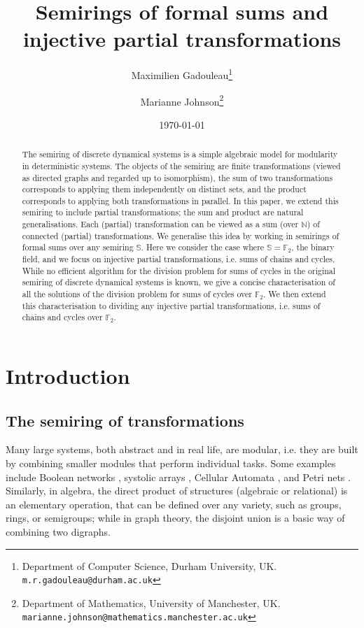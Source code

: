 \documentclass[a4paper, 11pt]{article}
\title{Semirings of formal sums and injective partial transformations}
\author{Maximilien Gadouleau\footnote{Department of Computer Science, Durham University, UK. \texttt{m.r.gadouleau@durham.ac.uk}} \and Marianne Johnson\footnote{Department of Mathematics,  University of Manchester, UK. \texttt{marianne.johnson@mathematics.manchester.ac.uk}}}
\date{\today}
\theoremstyle{plain}
\theoremstyle{definition}
\newcommand{\N} {\mathbb{N}}
\newcommand{\F} {\mathbb{F}}
\begin{document}
\maketitle

\begin{abstract}
The semiring of discrete dynamical systems is a simple algebraic model for modularity in deterministic systems. The objects of the semiring are finite transformations (viewed as directed graphs and regarded up to isomorphism), the sum of two transformations corresponds to applying them independently on distinct sets, and the product corresponds to applying both transformations in parallel. In this paper, we extend this semiring to include partial transformations; the sum and product are natural generalisations. Each (partial) transformation can be viewed as a sum (over $\N$) of connected (partial) transformations. We generalise this idea by working in semirings of formal sums over any semiring $\mathbb{S}$. Here we consider the case where $\mathbb{S} = \F_2$, the binary field, and we focus on injective partial transformations, i.e. sums of chains and cycles. While no efficient algorithm for the division problem for sums of cycles in the original semiring of discrete dynamical systems is known, we give a concise characterisation of all the solutions of the division problem for sums of cycles over $\F_2$. We then extend this characterisation to dividing any injective partial transformations, i.e. sums of chains and cycles over $\F_2$.
\end{abstract}

\section{Introduction} \label{section:introduction}

\subsection{The semiring of transformations} \label{subsection:semiring_of_transformations}

Many large systems, both abstract and in real life, are modular, i.e. they are built by combining smaller modules that perform individual tasks. Some examples include Boolean networks \cite{PPS21, KWVML23}, systolic arrays \cite{Pet92}, Cellular Automata \cite{Ped92, CCG01, McI09}, and Petri nets \cite{Dev16, Dev21, TCV22}. Similarly, in algebra, the direct product of structures (algebraic or relational) is an elementary operation, that can be defined over any variety, such as groups, rings, or semigroups; while in graph theory, the disjoint union is a basic way of combining two digraphs. 
\end{document}
